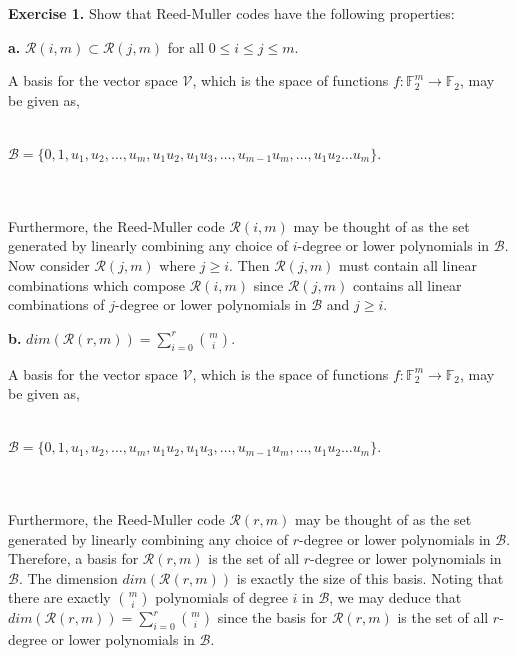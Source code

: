\documentclass[12pt]{article}
\begin{document}
\maketitle

\noindent \textbf{Exercise 1.} Show that Reed-Muller codes have the following properties:\\
\begin{adjustwidth}{0.5cm}{}
\textbf{a.} $\mathcal{R}(i, m) \subset \mathcal{R}(j, m)$ for all $0 \leq i \leq j \leq m$.\\
	\begin{adjustwidth}{0.5cm}{}
	A basis for the vector space $\mathcal{V}$, which is the space of functions $f : \mathbb{F}_2^m \rightarrow \mathbb{F}_2$, may be given as,\\\\
	\centerline{$\mathcal{B} = \{0, 1, u_1, u_2, \dots , u_m , u_1 u_2, u_1 u_3, \dots , u_{m-1} u_{m}, \dots , u_1 u_2 \dots u_m\}$.}\\\\
	Furthermore, the Reed-Muller code $\mathcal{R}(i, m)$ may be thought of as the set generated by linearly combining any choice of $i$-degree or lower polynomials in $\mathcal{B}$.  Now consider $\mathcal{R}(j, m)$ where $j \geq i$.  Then $\mathcal{R}(j, m)$ must contain all linear combinations which compose $\mathcal{R}(i, m)$ since $\mathcal{R}(j, m)$ contains all linear combinations of $j$-degree or lower polynomials in $\mathcal{B}$ and $j \geq i$.\\
	\end{adjustwidth}
\textbf{b.} $dim(\mathcal{R}(r, m)) = \sum\limits_{i = 0}^{r} {m \choose i}$.\\
	\begin{adjustwidth}{0.5cm}{}
	A basis for the vector space $\mathcal{V}$, which is the space of functions $f : \mathbb{F}_2^m \rightarrow \mathbb{F}_2$, may be given as,\\\\
	\centerline{$\mathcal{B} = \{0, 1, u_1, u_2, \dots , u_m , u_1 u_2, u_1 u_3, \dots , u_{m-1} u_{m}, \dots , u_1 u_2 \dots u_m\}$.}\\\\
	Furthermore, the Reed-Muller code $\mathcal{R}(r, m)$ may be thought of as the set generated by linearly combining any choice of $r$-degree or lower polynomials in $\mathcal{B}$.  Therefore, a basis for $\mathcal{R}(r, m)$ is the set of all $r$-degree or lower polynomials in $\mathcal{B}$.  The dimension $dim(\mathcal{R}(r, m))$ is exactly the size of this basis.  Noting that there are exactly ${m \choose i}$ polynomials of degree $i$ in $\mathcal{B}$, we may deduce that $dim(\mathcal{R}(r, m)) = \sum\limits_{i = 0}^{r} {m \choose i}$ since the basis for $\mathcal{R}(r, m)$ is the set of all $r$-degree or lower polynomials in $\mathcal{B}$.\\

\end{adjustwidth}
\end{adjustwidth}
\end{document}
